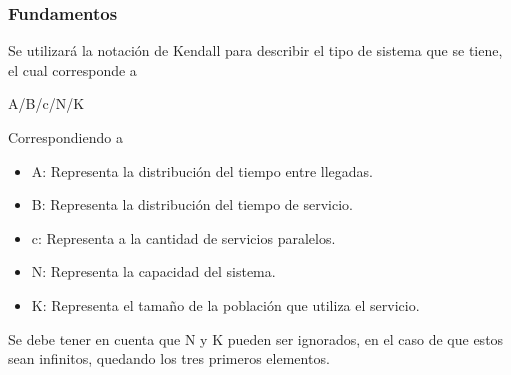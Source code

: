 \subsubsection{Fundamentos} %

\noindent Se utilizará la notación de Kendall para describir el tipo de sistema que se tiene, el cual corresponde a

\begin{center}
A/B/c/N/K
\end{center}

\noindent Correspondiendo a
\begin{itemize}
    \item A: Representa la distribución del tiempo entre llegadas.
    \item B: Representa la distribución del tiempo de servicio.
    \item c: Representa a la cantidad de servicios paralelos.
    \item N: Representa la capacidad del sistema.
    \item K: Representa el tamaño de la población que utiliza el servicio.
\end{itemize}
Se debe tener en cuenta que N y K pueden ser ignorados, en el caso de que estos sean infinitos, quedando los tres primeros elementos. \citep{kendall}

